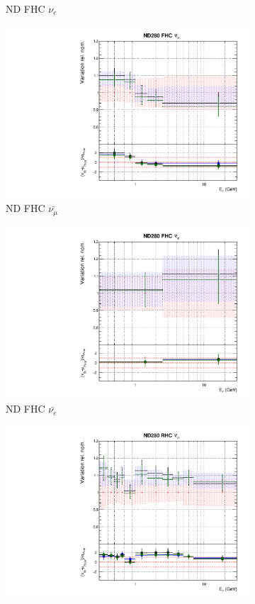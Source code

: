 \begin{figure}
\begin{subfigure}{0.24\textwidth}
  \caption{ND FHC $\nu_e$}
\end{subfigure}
\begin{subfigure}{0.24\textwidth}
  \centering
  \includegraphics[width=0.95\linewidth]{figs/polydataflux_2}
  \caption{ND FHC $\bar{\nu_{\mu}}$}
\end{subfigure}
\begin{subfigure}{0.24\textwidth}
  \centering
  \includegraphics[width=0.95\linewidth]{figs/polydataflux_3}
  \caption{ND FHC $\bar{\nu_{e}}$}
\end{subfigure}
\begin{subfigure}{0.24\textwidth}
  \centering
  \includegraphics[width=0.95\linewidth]{figs/polydataflux_4}

\end{subfigure}
\end{figure}
